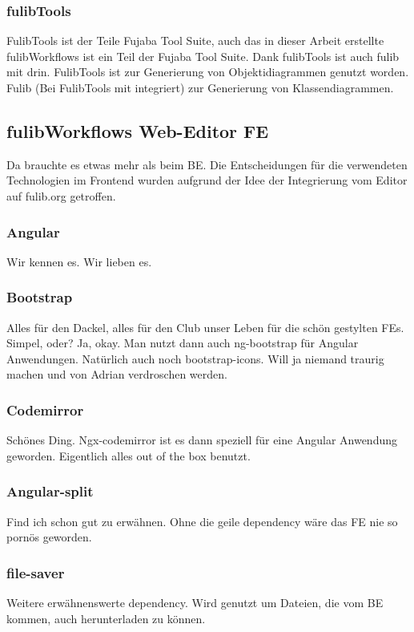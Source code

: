 \subsubsection{fulibTools}
FulibTools ist der Teile Fujaba Tool Suite, auch das in dieser Arbeit erstellte fulibWorkflows ist ein Teil der Fujaba Tool Suite.
\todo
Dank fulibTools ist auch fulib mit drin.
FulibTools ist zur Generierung von Objektidiagrammen genutzt worden.
Fulib (Bei FulibTools mit integriert) zur Generierung von Klassendiagrammen.

\subsection{fulibWorkflows Web-Editor FE}\label{subsec:fulibworkflows-web-editor}
\todo
Da brauchte es etwas mehr als beim BE\@.
Die Entscheidungen für die verwendeten Technologien im Frontend wurden aufgrund
der Idee der Integrierung vom Editor auf fulib.org getroffen.

\subsubsection{Angular}
\todo
Wir kennen es.
Wir lieben es.

\subsubsection{Bootstrap}
\todo
Alles für den Dackel, alles für den Club unser Leben für die schön gestylten FEs.
Simpel, oder?
Ja, okay.
Man nutzt dann auch ng-bootstrap für Angular Anwendungen.
Natürlich auch noch bootstrap-icons.
Will ja niemand traurig machen und von Adrian verdroschen werden.

\subsubsection{Codemirror}
\todo
Schönes Ding.
Ngx-codemirror ist es dann speziell für eine Angular Anwendung geworden.
Eigentlich alles out of the box benutzt.

\subsubsection{Angular-split}
\todo
Find ich schon gut zu erwähnen.
Ohne die geile dependency wäre das FE nie so pornös geworden.

\subsubsection{file-saver}
\todo
Weitere erwähnenswerte dependency.
Wird genutzt um Dateien, die vom BE kommen, auch herunterladen zu können.

